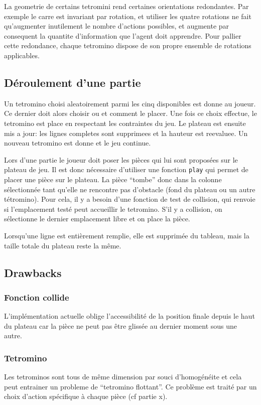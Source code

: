 \documentclass{article}
\begin{document}
La geometrie de certains tetromini rend certaines orientations redondantes. Par
exemple le carre est invariant par rotation, et utiliser les quatre rotations
ne fait qu'augmenter inutilement le nombre d'actions possibles, et augmente par
consequent la quantite d'information que l'agent doit apprendre. Pour pallier
cette redondance, chaque tetromino dispose de son propre ensemble de rotations
applicables.

\subsection{D\'eroulement d'une partie}
Un tetromino choisi aleatoirement parmi les cinq disponibles est donne au
joueur. Ce dernier doit alors choisir ou et comment le placer. Une fois ce
choix effectue, le tetromino est place en respectant les contraintes du jeu. Le
plateau est ensuite mis a jour: les lignes completes sont supprimees et la
hauteur est reevaluee. Un nouveau tetromino est donne et le jeu continue.


Lors d'une partie le joueur doit poser les pièces qui lui sont proposées sur
le plateau de jeu. Il est donc nécessaire d'utiliser une fonction \texttt{play}
qui permet de placer une pièce sur le plateau. La pièce ``tombe'' donc dans la
colonne sélectionnée tant qu'elle ne rencontre pas d'obstacle (fond du plateau
ou un autre tétromino). Pour cela, il y a besoin d'une fonction de test de
collision, qui renvoie si l'emplacement testé peut accueillir le tetromino.
S'il y a collision, on sélectionne le dernier emplacement libre et on place la
pièce.

Lorsqu'une ligne est entièrement remplie, elle est supprimée du tableau, mais
la taille totale du plateau reste la même.

\subsection{Drawbacks}
\subsubsection{Fonction collide}
L'implémentation actuelle oblige l'accessibilit\'e de la position finale depuis
le haut du plateau car la pi\`ece ne peut pas \^etre gliss\'ee au dernier moment
sous une autre.
\subsubsection{Tetromino}
Les tetrominos sont tous de même dimension par souci d'homogénéite et cela
peut entrainer un probleme de ``tetromino flottant''. Ce problème est traité par
un choix d'action spécifique à chaque pièce (cf partie x).
\end{document}
